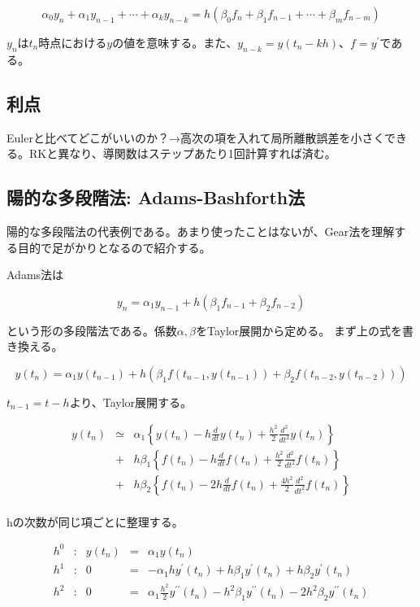 \[\alpha_{0} y_{n} + \alpha_{1} y_{n-1} + \cdots + \alpha_{k} y_{n-k} = h(\beta_{0}f_{n} + \beta_{1}f_{n-1} + \cdots  + \beta_{m}f_{n-m})\]

\(y_n\)は\(t_n\)時点における\(y\)の値を意味する。また、\(y_{n-k}=y(t_n-kh)\)、\(f=y^{\prime}\)である。

\subsection{利点}
Eulerと比べてどこがいいのか？→高次の項を入れて局所離散誤差を小さくできる。RKと異なり、導関数はステップあたり1回計算すれば済む。


\subsection{陽的な多段階法: Adams-Bashforth法}
陽的な多段階法の代表例である。あまり使ったことはないが、Gear法を理解する目的で足がかりとなるので紹介する。

Adams法は

\[ y_n = \alpha_1 y_{n-1} + h( \beta_1 f_{n-1} + \beta_2 f_{n-2})\]

という形の多段階法である。係数\(\alpha, \beta\)をTaylor展開から定める。
まず上の式を書き換える。

\[ y(t_n) = \alpha_1 y(t_{n-1}) + h( \beta_1 f( t_{n-1} , y(t_{n-1}) ) + \beta_2 f( t_{n-2} , y(t_{n-2}) ))\]

\(t_{n-1} = t - h\)より、Taylor展開する。

\begin{eqnarray*}
y(t_n) & \simeq & \alpha_1 \left\{y(t_{n}) - h \frac{d}{dt} y(t_n) + \frac{h^2}{2} \frac{d^2}{dt^2} y(t_{n}) \right\} \\
 & + & h \beta_1 \left\{ f(t_n) - h \frac{d}{dt} f(t_n) + \frac{h^2}{2} \frac{d^2}{dt^2} f(t_{n}) \right\}\\
 & + & h \beta_2 \left\{ f(t_n) - 2h \frac{d}{dt} f(t_n) + \frac{4h^2}{2} \frac{d^2}{dt^2} f(t_{n}) \right\}\\
\end{eqnarray*}

hの次数が同じ項ごとに整理する。

\[
\begin{array}{lccll}
h^0 & : & y(t_n) & = & \alpha_1 y(t_n)\\
h^1 & : & 0 & = & - \alpha_1 h y^{\prime}(t_n) + h \beta_1 y^{\prime}(t_n) + h \beta_2 y^{\prime}(t_n)\\
h^2 & : & 0 & = & \alpha_1 \frac{h^2}{2} y^{\prime\prime}(t_n) - h^2 \beta_1 y^{\prime\prime}(t_n) -2 h^2 \beta_2 y^{\prime\prime}(t_n)\\
\end{array}
\]

